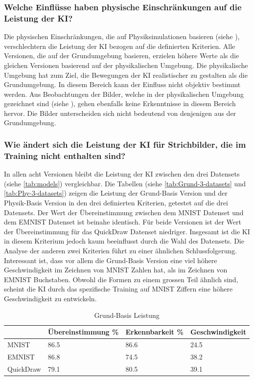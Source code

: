\subsubsection*{Welche Einflüsse haben physische Einschränkungen auf die
Leistung der KI?}\label{subsub:d_frage_unter_4} Die physischen Einschränkungen,
die auf Physiksimulationen basieren (siehe ),
verschlechtern die Leistung der KI bezogen auf die definierten Kriterien. Alle
Versionen, die auf der Grundumgebung basieren, erzielen höhere Werte als die
gleichen Versionen basierend auf der physikalischen Umgebung. Die physikalische
Umgebung hat zum Ziel, die Bewegungen der KI realistischer zu gestalten als die
Grundumgebung. In diesem Bereich kann der Einfluss nicht objektiv bestimmt
werden. Aus Beobachtungen der Bilder, welche in der physikalischen Umgebung
gezeichnet sind (siehe ), gehen ebenfalls keine
Erkenntnisse in diesem Bereich hervor. Die Bilder unterscheiden sich nicht
bedeutend von denjenigen aus der Grundumgebung.
 
\subsubsection*{Wie ändert sich die Leistung der KI für Strichbilder, die im Training nicht enthalten sind?}\label{subsub:d_frage_unter_5}
In allen acht Versionen bleibt die Leistung der KI zwischen den drei Datensets
(siehe \autoref{tab:models}) vergleichbar. Die Tabellen (siehe \autoref{tab:Grund-3-datasets} und \autoref{tab:Phy-3-datasets})
zeigen die Leistung der Grund-Basis Version und der
Physik-Basis Version in den drei definierten Kriterien, getestet auf die drei
Datensets. Der Wert der Übereinstimmung zwischen dem MNIST Datenset und dem
EMNIST Datenset ist beinahe identisch. Für beide Versionen ist der Wert der
Übereinstimmung für das QuickDraw Datenset niedriger. Insgesamt ist die KI in
diesem Kriterium jedoch kaum beeinflusst durch die Wahl des Datensets. Die
Analyse der anderen zwei Kriterien führt zu einer ähnlichen Schlussfolgerung.
Interessant ist, dass vor allem die Grund-Basis Version eine viel höhere
Geschwindigkeit im Zeichnen von MNIST Zahlen hat, als im Zeichnen von EMNIST
Buchstaben. Obwohl die Formen zu einem grossen Teil ähnlich sind, scheint die KI durch
das spezifische Training auf MNIST Ziffern eine höhere Geschwindigkeit zu
entwickeln.
 
\begin{table}[!ht]
   \centering
   \caption{Grund-Basis Leistung}\label{tab:Grund-3-datasets}
   \begin{tabular}{|l|l|l|l|}
       \hline
           ~ & Übereinstimmung \% & Erkennbarkeit \% & Geschwindigkeit \\ \hline
           MNIST & 86.5 & 86.6 & 24.5 \\ \hline
           EMNIST & 86.8 & 74.5 & 38.2 \\ \hline
           QuickDraw & 79.1 & 80.5 & 39.1 \\ \hline 
       \end{tabular}
\end{table}
 
